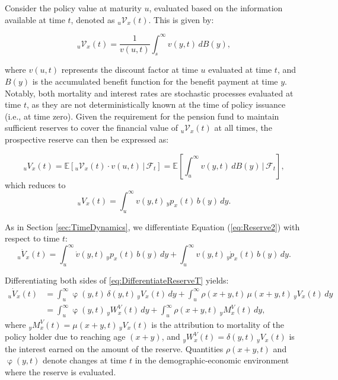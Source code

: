 \documentclass[12pt]{article}
\begin{document}
{Consider the policy value at maturity \( u \), evaluated based on the information available at time \( t \), denoted as \({}_u\mathcal{V}_x(t)\). This is given by:

\[
{}_u\mathcal{V}_x(t) = \frac{1}{v(u, t)} \int_s^{\infty} v(y, t) \, dB(y),
\]

where \( v(u, t) \) represents the discount factor at time \( u \) evaluated at time \( t \), and \( B(y) \) is the accumulated benefit function for the benefit payment at time \( y \). Notably, both mortality and interest rates are stochastic processes evaluated at time \( t \), as they are not deterministically known at the time of policy issuance (i.e., at time zero). Given the requirement for the pension fund to maintain sufficient reserves to cover the financial value of \({}_u\mathcal{V}_x(t)\) at all times, the prospective reserve can then be expressed as:

\begin{equation}\label{eq:Reserve1}
	{}_uV_x(t) = \mathbb{E}[{}_u\mathcal{V}_x(t) \cdot v(u,t) \,|\, \mathcal{F}_t] = \mathbb{E} \left[ \int_u^\infty v(y,t) \, dB(y) \,|\, \mathcal{F}_t \right],
\end{equation}
which reduces to
\begin{equation}\label{eq:Reserve2}
	{}_uV_x(t) = \int_u^\infty v(y,t) \, {}_yp_x(t) \, b(y) \, dy.
\end{equation}

As in Section \ref{sec:TimeDynamics}, we differentiate Equation (\ref{eq:Reserve2}) with respect to time $t$:
\begin{equation}\label{eq:DifferentiateReserveT}
	{}_u\dot{V}_x(t) = \int_u^\infty \dot{v}(y,t) \, {}_yp_x(t) \, b(y) \, dy + \int_u^\infty v(y,t) \, {}_y\dot{p}_x(t) \, b(y) \, dy.
\end{equation}

Differentiating both sides of \eqref{eq:DifferentiateReserveT} yields:
\begin{equation}\label{eq:DifferentiateReserveT2}
	\begin{split}
		{}_u\dot{V}_x(t) &= \int_u^\infty \upvarphi(y,t) \, \delta(y,t) \, {}_yV_x(t) \, dy + \int_u^\infty \rho(x+y,t) \, \mu(x+y,t) \, {}_yV_x(t) \, dy \\ 
		&= \int_u^\infty \upvarphi(y,t) \, {}_yW^V_x(t) \, dy + \int_u^\infty \rho(x+y,t) \, {}_yM^V_x(t) \, dy,
	\end{split}
\end{equation}
where ${}_yM^V_x(t) = \mu(x+y,t) \, {}_yV_x(t)$ is the attribution to mortality of the policy holder due to reaching age $(x+y)$, and ${}_yW^V_x(t) = \delta(y,t) \, {}_yV_x(t)$ is the interest earned on the amount of the reserve. Quantities $\rho(x+y,t)$ and $\upvarphi(y,t)$ denote changes at time $t$ in the demographic-economic environment where the reserve is evaluated. 


}
\end{document}
